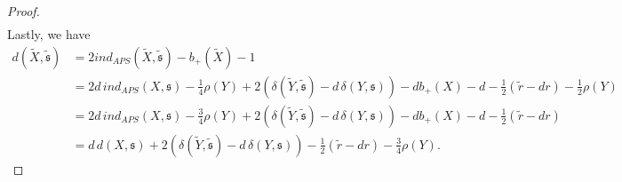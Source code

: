\documentclass[10pt,a4paper]{amsart}
\begin{document}
\begin{proof}
\begin{align*}
\end{align*}
Lastly, we have
\begin{align*}
d(\widetilde{X} , \widetilde{\mathfrak{s}}) &= 2 ind_{APS}(\widetilde{X} , \widetilde{\mathfrak{s}}) - b_+(\widetilde{X}) - 1 \\
&= 2d \, ind_{APS}(X , \mathfrak{s}) - \frac{1}{4}\rho(Y) + 2(\delta(\widetilde{Y} , \widetilde{\mathfrak{s}}) - d \, \delta(Y , \mathfrak{s})) - d b_+(X) - d -\frac{1}{2}( \widetilde{r} - dr) - \frac{1}{2}\rho(Y) \\
&= 2d \, ind_{APS}(X , \mathfrak{s}) - \frac{3}{4}\rho(Y) + 2(\delta(\widetilde{Y} , \widetilde{\mathfrak{s}}) - d \, \delta(Y , \mathfrak{s})) - d b_+(X) - d -\frac{1}{2}( \widetilde{r} - dr) \\
&= d \, d(X , \mathfrak{s}) + 2(\delta(\widetilde{Y} , \widetilde{\mathfrak{s}}) - d \, \delta(Y , \mathfrak{s})) -\frac{1}{2}( \widetilde{r} - dr) - \frac{3}{4}\rho(Y).
\end{align*}

\end{proof}
\end{document}
